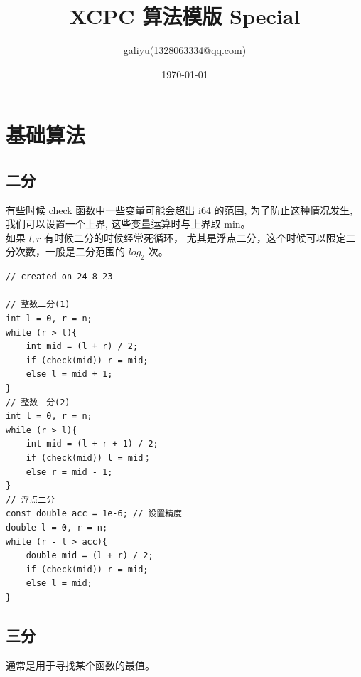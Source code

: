 \documentclass[a4paper,12pt]{article}
\title{XCPC 算法模版 Special}
\author{galiyu(1328063334@qq.com)}
\date{\today}
\begin{document}
\maketitle
\thispagestyle{empty}
\clearpage
\newpage

\pagestyle{fancy}
\fancyhead{}
\fancyfoot{}
\tableofcontents
\newpage

\fancyhead[R]{\thepage}

\section{基础算法}
\subsection{二分}

\noindent 有些时候 check 函数中一些变量可能会超出 i64 的范围, 为了防止这种情况发生, 
我们可以设置一个上界, 这些变量运算时与上界取 min。\\

\noindent 如果 \(l, r\) 有时候二分的时候经常死循环，
尤其是浮点二分，这个时候可以限定二分次数，一般是二分范围的 \(log_2\) 次。 

\begin{lstlisting}
// created on 24-8-23

// 整数二分(1)
int l = 0, r = n;
while (r > l){
    int mid = (l + r) / 2;
    if (check(mid)) r = mid;
    else l = mid + 1;
}
// 整数二分(2)
int l = 0, r = n;
while (r > l){
    int mid = (l + r + 1) / 2;
    if (check(mid)) l = mid；
    else r = mid - 1;
}
// 浮点二分
const double acc = 1e-6; // 设置精度
double l = 0, r = n;
while (r - l > acc){
    double mid = (l + r) / 2;
    if (check(mid)) r = mid;
    else l = mid;
}
\end{lstlisting}

\subsection{三分}

\noindent 通常是用于寻找某个函数的最值。
\end{document}
